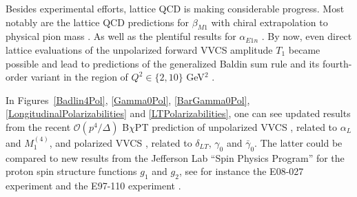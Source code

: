 \documentclass[preprints,review,accept,moreauthors,pdftex]{Definitions/mdpi}
\def\al{\alpha}
\def\ga{\gamma} \def\Ga{{\it\Gamma}}
\begin{document}
Besides experimental efforts,
lattice QCD is making considerable progress. Most notably are the lattice QCD predictions for $\beta_{M1}$ with chiral extrapolation to physical pion mass \cite{Bignell:2018acn,Bignell:2020xkf}. As well as the plentiful results for $\al_{E1n}$ \cite{Lujan:2016ffj,Detmold:2010ts,Engelhardt:2007ub,Christensen:2004ca}. By now, even direct lattice evaluations of the unpolarized forward VVCS amplitude $T_1$ became possible and lead to predictions of the generalized Baldin sum rule and its fourth-order variant in the region of $Q
^2 \in \{ 2, 10\}$ GeV$^2$  \cite{Hannaford-Gunn:2020pvu,Chambers:2017dov}.

In Figures~\ref{Badlin4Pol}, \ref{Gamma0Pol}, \ref{BarGamma0Pol}, \ref{LongitudinalPolarizabilities} and \ref{LTPolarizabilities}, one can see updated results from the recent $\mathcal{O}(p^4/\Delta)$ B$\chi$PT prediction of unpolarized VVCS \cite{Alarcon:2020wjg}, related to $\al_L$ and $M_1^{(4)}$, and polarized VVCS \cite{Alarcon:2020icz}, related to $\delta_{LT}$, $\ga_0$ and $\bar \ga_0$. The latter could be compared to new results from the Jefferson Lab ``Spin Physics Program'' for the proton spin structure functions $g_1$ and $g_2$, see for instance the E08-027 experiment \cite{Zielinski:2017gwp} and the E97-110 experiment \cite{Sulkosky:2019zmn}. 
\end{document}
